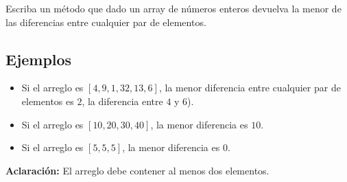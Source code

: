 Escriba un método que dado un array de números enteros devuelva la menor de las diferencias entre cualquier par de elementos.

\subsection*{Ejemplos}

\begin{itemize}
    \item Si el arreglo es \([4, 9, 1, 32, 13, 6]\), la menor diferencia entre cualquier par de elementos es \(2\), la diferencia entre \(4\) y \(6\)).
    \item Si el arreglo es \([10, 20, 30, 40]\), la menor diferencia es \(10\).
    \item Si el arreglo es \([5, 5, 5]\), la menor diferencia es \(0\).
\end{itemize}

\textbf{Aclaración:} El arreglo debe contener al menos dos elementos.
